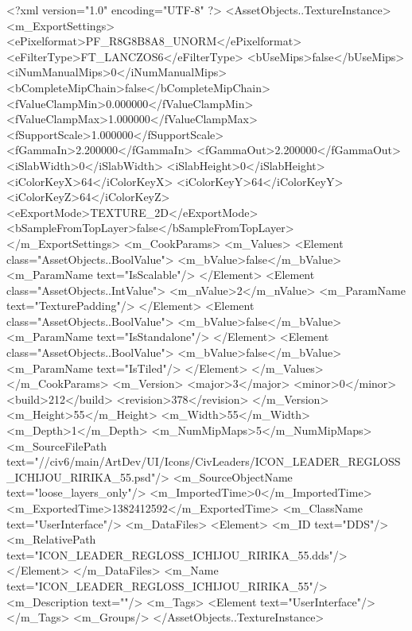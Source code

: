 <?xml version="1.0" encoding="UTF-8" ?>
<AssetObjects..TextureInstance>
	<m_ExportSettings>
		<ePixelformat>PF_R8G8B8A8_UNORM</ePixelformat>
		<eFilterType>FT_LANCZOS6</eFilterType>
		<bUseMips>false</bUseMips>
		<iNumManualMips>0</iNumManualMips>
		<bCompleteMipChain>false</bCompleteMipChain>
		<fValueClampMin>0.000000</fValueClampMin>
		<fValueClampMax>1.000000</fValueClampMax>
		<fSupportScale>1.000000</fSupportScale>
		<fGammaIn>2.200000</fGammaIn>
		<fGammaOut>2.200000</fGammaOut>
		<iSlabWidth>0</iSlabWidth>
		<iSlabHeight>0</iSlabHeight>
		<iColorKeyX>64</iColorKeyX>
		<iColorKeyY>64</iColorKeyY>
		<iColorKeyZ>64</iColorKeyZ>
		<eExportMode>TEXTURE_2D</eExportMode>
		<bSampleFromTopLayer>false</bSampleFromTopLayer>
	</m_ExportSettings>
	<m_CookParams>
		<m_Values>
			<Element class="AssetObjects..BoolValue">
				<m_bValue>false</m_bValue>
				<m_ParamName text="IsScalable"/>
			</Element>
			<Element class="AssetObjects..IntValue">
				<m_nValue>2</m_nValue>
				<m_ParamName text="TexturePadding"/>
			</Element>
			<Element class="AssetObjects..BoolValue">
				<m_bValue>false</m_bValue>
				<m_ParamName text="IsStandalone"/>
			</Element>
			<Element class="AssetObjects..BoolValue">
				<m_bValue>false</m_bValue>
				<m_ParamName text="IsTiled"/>
			</Element>
		</m_Values>
	</m_CookParams>
	<m_Version>
		<major>3</major>
		<minor>0</minor>
		<build>212</build>
		<revision>378</revision>
	</m_Version>
	<m_Height>55</m_Height>
	<m_Width>55</m_Width>
	<m_Depth>1</m_Depth>
	<m_NumMipMaps>5</m_NumMipMaps>
	<m_SourceFilePath text="//civ6/main/ArtDev/UI/Icons/CivLeaders/ICON_LEADER_REGLOSS_ICHIJOU_RIRIKA_55.psd"/>
	<m_SourceObjectName text="loose_layers_only"/>
	<m_ImportedTime>0</m_ImportedTime>
	<m_ExportedTime>1382412592</m_ExportedTime>
	<m_ClassName text="UserInterface"/>
	<m_DataFiles>
		<Element>
			<m_ID text="DDS"/>
			<m_RelativePath text="ICON_LEADER_REGLOSS_ICHIJOU_RIRIKA_55.dds"/>
		</Element>
	</m_DataFiles>
	<m_Name text="ICON_LEADER_REGLOSS_ICHIJOU_RIRIKA_55"/>
	<m_Description text=""/>
	<m_Tags>
		<Element text="UserInterface"/>
	</m_Tags>
	<m_Groups/>
</AssetObjects..TextureInstance>

